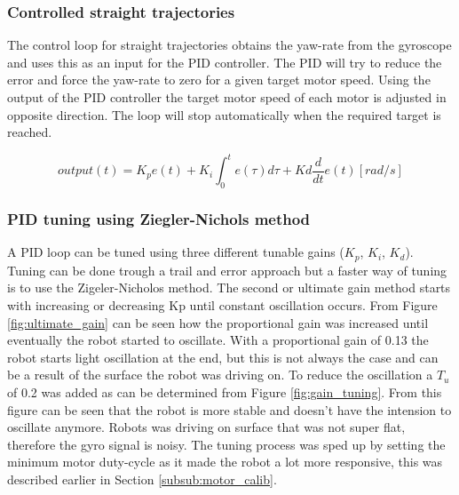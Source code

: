 \subsubsection{Controlled straight trajectories}


The control loop for straight trajectories obtains the yaw-rate from the gyroscope and uses this as an input for the PID controller.
The PID will try to reduce the error and force the yaw-rate to zero for a given target motor speed.
Using the output of the PID controller the target motor speed of each motor is adjusted in opposite direction.
The loop will stop automatically when the required target is reached.

\begin{equation}
output(t) = K_{p}e(t) + K_{i} \int_{0}^{t}e(\tau)d\tau + Kd\frac{d}{dt}e(t) [rad/s]
\end{equation}

\subsubsection{PID tuning using Ziegler-Nichols method}


A PID loop can be tuned using three different tunable gains ($K_{p}$, $K_{i}$, $K_{d}$).
Tuning can be done trough a trail and error approach but a faster way of tuning is to use the Zigeler-Nicholos method.
The second or ultimate gain method starts with increasing or decreasing Kp until constant oscillation occurs.
From Figure \ref{fig:ultimate_gain} can be seen how the proportional gain was increased until eventually the robot started to oscillate.
With a proportional gain of 0.13 the robot starts light oscillation at the end, but this is not always the case and can be a result of the surface the robot was driving on.
To reduce the oscillation a $T_{u}$ of 0.2 was added as can be determined from Figure \ref{fig:gain_tuning}.
From this figure can be seen that the robot is more stable and doesn't have the intension to oscillate anymore.
Robots was driving on surface that was not super flat, therefore the gyro signal is noisy.
The tuning process was sped up by setting the minimum motor duty-cycle as it made the robot a lot more responsive, this was described earlier in Section \ref{subsub:motor_calib}.


